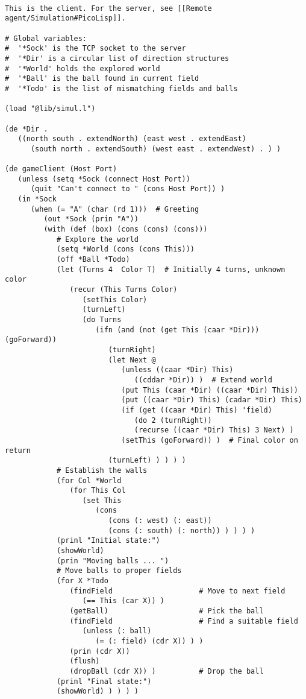 \begin{verbatim}

This is the client. For the server, see [[Remote agent/Simulation#PicoLisp]].

# Global variables:
#  '*Sock' is the TCP socket to the server
#  '*Dir' is a circular list of direction structures
#  '*World' holds the explored world
#  '*Ball' is the ball found in current field
#  '*Todo' is the list of mismatching fields and balls

(load "@lib/simul.l")

(de *Dir .
   ((north south . extendNorth) (east west . extendEast)
      (south north . extendSouth) (west east . extendWest) . ) )

(de gameClient (Host Port)
   (unless (setq *Sock (connect Host Port))
      (quit "Can't connect to " (cons Host Port)) )
   (in *Sock
      (when (= "A" (char (rd 1)))  # Greeting
         (out *Sock (prin "A"))
         (with (def (box) (cons (cons) (cons)))
            # Explore the world
            (setq *World (cons (cons This)))
            (off *Ball *Todo)
            (let (Turns 4  Color T)  # Initially 4 turns, unknown color
               (recur (This Turns Color)
                  (setThis Color)
                  (turnLeft)
                  (do Turns
                     (ifn (and (not (get This (caar *Dir))) (goForward))
                        (turnRight)
                        (let Next @
                           (unless ((caar *Dir) This)
                              ((cddar *Dir)) )  # Extend world
                           (put This (caar *Dir) ((caar *Dir) This))
                           (put ((caar *Dir) This) (cadar *Dir) This)
                           (if (get ((caar *Dir) This) 'field)
                              (do 2 (turnRight))
                              (recurse ((caar *Dir) This) 3 Next) )
                           (setThis (goForward)) )  # Final color on return
                        (turnLeft) ) ) ) )
            # Establish the walls
            (for Col *World
               (for This Col
                  (set This
                     (cons
                        (cons (: west) (: east))
                        (cons (: south) (: north)) ) ) ) )
            (prinl "Initial state:")
            (showWorld)
            (prin "Moving balls ... ")
            # Move balls to proper fields
            (for X *Todo
               (findField                    # Move to next field
                  (== This (car X)) )
               (getBall)                     # Pick the ball
               (findField                    # Find a suitable field
                  (unless (: ball)
                     (= (: field) (cdr X)) ) )
               (prin (cdr X))
               (flush)
               (dropBall (cdr X)) )          # Drop the ball
            (prinl "Final state:")
            (showWorld) ) ) ) )


\end{verbatim}
